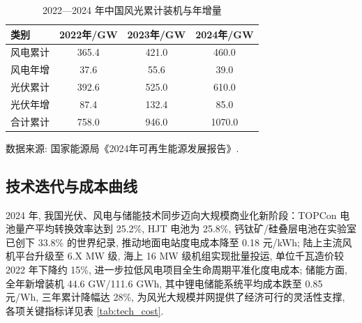 \documentclass[a4paper,11pt,AutoFakeBold]{article}
\begin{document}
\begin{table}[H]
  \centering
  \begin{threeparttable}
    \caption{2022—2024 年中国风光累计装机与年增量}
    \begin{tabular}{lS[table-format=4.1]S[table-format=4.1]S[table-format=4.1]}
      \toprule
      类别 & {2022年/GW} & {2023年/GW} & {2024年/GW}\\
      \midrule
      风电累计 & 365.4 & 421.0 & 460.0\\
      风电年增 & 37.6 & 55.6 & 39.0\\
      光伏累计 & 392.6 & 525.0 & 610.0\\
      光伏年增 & 87.4 & 132.4 & 85.0\\
      合计累计 & 758.0 & 946.0 & 1070.0\\
      \bottomrule
    \end{tabular}
    \begin{tablenotes}
      \item 数据来源: 国家能源局《2024年可再生能源发展报告》. 
    \end{tablenotes}
    \label{tab:install_capacity}
  \end{threeparttable}
\end{table}

\subsection{技术迭代与成本曲线}
2024 年, 我国光伏、风电与储能技术同步迈向大规模商业化新阶段：TOPCon 电池量产平均转换效率达到 25.2\%, HJT 电池为 25.8\%, 钙钛矿/硅叠层电池在实验室已创下 33.8\% 的世界纪录, 推动地面电站度电成本降至 0.18 元/kWh\cite{ref1}; 陆上主流风机平台升级至 6.X MW 级, 海上 16 MW 级机组实现批量投运, 单位千瓦造价较 2022 年下降约 15\%, 进一步拉低风电项目全生命周期平准化度电成本; 储能方面, 全年新增装机 44.6 GW/111.6 GWh, 其中锂电储能系统平均成本跌至 0.85 元/Wh, 三年累计降幅达 28\%\cite{ref1}, 为风光大规模并网提供了经济可行的灵活性支撑, 各项关键指标详见表 \ref{tab:tech_cost}. 
\end{document}

